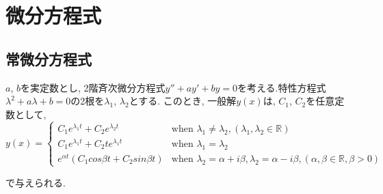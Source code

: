 \chapter{微分方程式} %
\label{cha:微分方程式}
\section{常微分方程式} %
\label{sec:常微分方程式}
\begin{theo}
    $a$, $b$を実定数とし, 2階斉次微分方程式$y''+ay'+by=0$を考える.特性方程式$\lambda^2+a\lambda+b=0$の2根を$\lambda_{1}$, $\lambda_{2}$とする. このとき, 一般解$y(x)$は, $C_{1}$, $C_{2}$を任意定数として, 
    \begin{equation}
        y(x)= \begin{cases}
                C_{1}e^{\lambda_{1} t}+C_{2}e^{\lambda_{2} t} &\text{when }\lambda_{1}\neq\lambda_{2}, (\lambda_{1}, \lambda_{2}\in\mathbb{R}) \\
                C_{1}e^{\lambda_{1} t}+C_{2}te^{\lambda_{1} t} &\text{when }\lambda_{1}=\lambda_{2} \\
                e^{\alpha t}(C_{1}cos{\beta t}+C_{2}sin{\beta t}) &\text{when }\lambda_{2}=\alpha+{i\beta}, \lambda_{2}=\alpha-{i\beta}, (\alpha, \beta\in\mathbb{R}, \beta>0)
        \end{cases}
    \end{equation}
\end{theo}
で与えられる.
